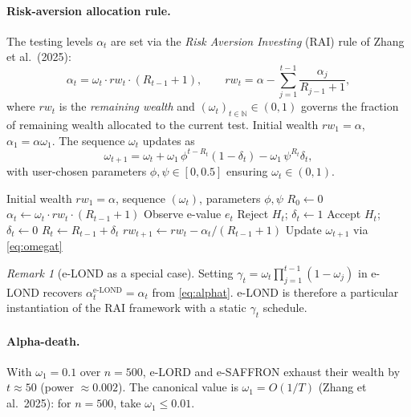 \documentclass[11pt,a4paper]{article}
\theoremstyle{plain}
\theoremstyle{definition}
\theoremstyle{remark}
\newtheorem{remark}[theorem]{Remark}
\begin{document}
\paragraph{Risk-aversion allocation rule.}
The testing levels $\alpha_t$ are set via the \emph{Risk Aversion Investing}
(RAI) rule of Zhang et al.\ (2025):
\begin{equation}\label{eq:alphat}
  \alpha_t = \omega_t \cdot rw_t \cdot (R_{t-1} + 1),
  \qquad
  rw_t = \alpha - \sum_{j=1}^{t-1} \frac{\alpha_j}{R_{j-1}+1},
\end{equation}
where $rw_t$ is the \emph{remaining wealth} and $(\omega_t)_{t \in
\mathbb{N}} \in (0,1)$ governs the fraction of remaining wealth allocated to
the current test. Initial wealth $rw_1 = \alpha$, $\alpha_1 = \alpha
\omega_1$. The sequence $\omega_t$ updates as
\begin{equation}\label{eq:omegat}
  \omega_{t+1} = \omega_t + \omega_1\,\phi^{t-R_t}(1-\delta_t) - \omega_1\,\psi^{R_t}\delta_t,
\end{equation}
with user-chosen parameters $\phi, \psi \in [0, 0.5]$ ensuring $\omega_t \in
(0,1)$.

\begin{algorithm}
\caption{e-LORD}
\label{alg:elord}
\begin{algorithmic}[1]
\Require Initial wealth $rw_1 = \alpha$, sequence $(\omega_t)$, parameters $\phi, \psi$
\State $R_0 \leftarrow 0$
    \State $\alpha_t \leftarrow \omega_t \cdot rw_t \cdot (R_{t-1} + 1)$
    \State Observe e-value $e_t$
        \State Reject $H_t$; $\delta_t \leftarrow 1$
    \Else
        \State Accept $H_t$; $\delta_t \leftarrow 0$
    \EndIf
    \State $R_t \leftarrow R_{t-1} + \delta_t$
    \State $rw_{t+1} \leftarrow rw_t - \alpha_t/(R_{t-1}+1)$
    \State Update $\omega_{t+1}$ via \eqref{eq:omegat}
\EndFor
\end{algorithmic}
\end{algorithm}

\begin{remark}[e-LOND as a special case]
Setting $\gamma_t = \omega_t \prod_{j=1}^{t-1}(1 - \omega_j)$ in e-LOND
recovers $\alpha_t^{\text{e-LOND}} = \alpha_t$ from \eqref{eq:alphat}. e-LOND
is therefore a particular instantiation of the RAI framework with a static
$\gamma_t$ schedule.
\end{remark}


\paragraph{Alpha-death.}
With $\omega_1 = 0.1$ over $n = 500$, e-LORD and e-SAFFRON exhaust their
wealth by $t \approx 50$ (power $\approx 0.002$). The canonical value is
$\omega_1 = O(1/T)$ (Zhang et al.\ 2025): for $n = 500$, take
$\omega_1 \leq 0.01$.
\end{document}
